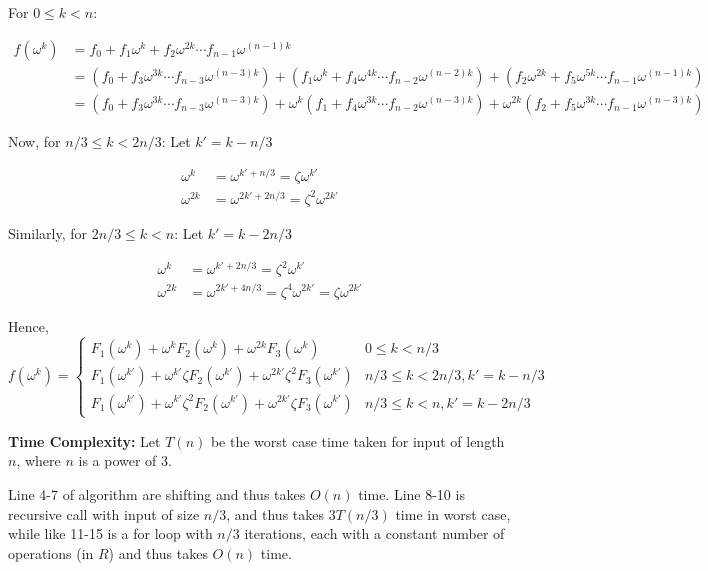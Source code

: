 For $0 \le k < n: $

\begin{align*}
    f(\omega^k) &= f_0 + f_1 \omega^k + f_2 \omega^{2k} \cdots f_{n-1} \omega^{(n-1)k} \\
    &= (f_0 + f_3 \omega^{3k} \cdots f_{n-3} \omega^{(n-3)k}) + (f_1 \omega^k + f_4 \omega^{4k} \cdots f_{n-2} \omega^{(n-2)k}) + (f_2 \omega^{2k} + f_5 \omega^{5k} \cdots f_{n-1} \omega^{(n-1)k}) \\
    &= (f_0 + f_3 \omega^{3k} \cdots f_{n-3} \omega^{(n-3)k}) + \omega^k (f_1 + f_4 \omega^{3k} \cdots f_{n-2} \omega^{(n-3)k}) + \omega^{2k} (f_2 + f_5 \omega^{3k} \cdots f_{n-1} \omega^{(n-3)k})
\end{align*}

Now, for $n/3 \le k < 2n/3$: Let $k' = k - n/3$

\begin{align*}
    \omega^k &= \omega^{k' + n/3} = \zeta \omega^{k'} \\
    \omega^{2k} &= \omega^{2k' + 2n/3} = \zeta^2 \omega^{2k'}
\end{align*}

Similarly, for $2n/3 \le k < n$: Let $k' = k - 2n/3$

\begin{align*}
    \omega^k &= \omega^{k' + 2n/3} = \zeta^2 \omega^{k'} \\
    \omega^{2k} &= \omega^{2k' + 4n/3} = \zeta^4 \omega^{2k'} = \zeta \omega^{2k'}
\end{align*}

Hence, 
\[ f(\omega^k) = 
\begin{cases}
    F_1(\omega^k) + \omega^k F_2(\omega^k) + \omega^{2k} F_3(\omega^k) & 0 \le k < n/3 \\
    F_1(\omega^{k'}) + \omega^{k'} \zeta F_2(\omega^{k'}) + \omega^{2k'} \zeta^2 F_3(\omega^{k'}) & n/3 \le k < 2n/3, k' = k - n/3 \\
    F_1(\omega^{k'}) + \omega^{k'} \zeta^2 F_2(\omega^{k'}) + \omega^{2k'} \zeta F_3(\omega^{k'}) & n/3 \le k < n, k' = k - 2n/3
\end{cases}
\]

\textbf{Time Complexity: } Let $T(n)$ be the worst case time taken for input of length $n$, where $n$ is a power of $3$.

Line 4-7 of algorithm are shifting and thus takes $O(n)$ time. Line 8-10 is recursive call with input of size $n/3$, and thus takes $3 T(n/3)$ time in worst case, while like 11-15 is a for loop with $n/3$ iterations, each with a constant number of operations (in $R$) and thus takes $O(n)$ time.

